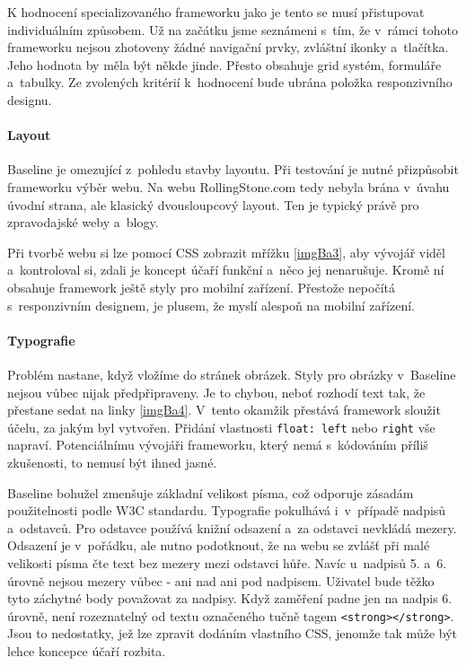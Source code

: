 \documentclass[thesis=B,czech]{FITthesis}[2012/06/26]
\begin{document}
K hodnocení specializovaného frameworku jako je tento se musí přistupovat individuálním způsobem. Už na začátku jsme seznámeni s~tím, že v~rámci tohoto frameworku nejsou zhotoveny žádné navigační prvky, zvláštní ikonky a~tlačítka. Jeho hodnota by měla být někde jinde. Přesto obsahuje grid  systém, formuláře a~tabulky. Ze zvolených kritérií k~hodnocení bude ubrána položka responzivního designu.

\paragraph{Layout}

Baseline je omezující z~pohledu stavby layoutu. Při testování je nutné přizpůsobit frameworku výběr webu. Na webu RollingStone.com tedy nebyla brána v~úvahu úvodní strana, ale klasický dvousloupcový layout. Ten je typický právě pro zpravodajské weby a~blogy.

Při tvorbě webu si lze pomocí \gls{CSS} zobrazit mřížku \ref{imgBa3}, aby vývojář viděl a~kontroloval si, zdali je koncept účaří funkční a~něco jej nenarušuje. Kromě ní obsahuje framework ještě styly pro mobilní zařízení. Přestože nepočítá s~responzivním designem, je plusem, že myslí alespoň na mobilní zařízení. 



\paragraph{Typografie}

Problém nastane, když vložíme do stránek obrázek. Styly pro obrázky v~Baseline nejsou vůbec nijak předpřipraveny. Je to chybou, neboť rozhodí text tak, že přestane sedat na linky \ref{imgBa4}. V~tento okamžik přestává framework sloužit účelu, za jakým byl vytvořen. Přidání vlastnosti \verb#float: left# nebo \verb#right# vše napraví. Potenciálnímu vývojáři frameworku, který nemá s~kódováním příliš zkušenosti, to nemusí být ihned jasné. 

Baseline bohužel zmenšuje základní velikost písma, což odporuje zásadám použitelnosti podle \gls{W3C} standardu\cite{wcag}. Typografie pokulhává i~v~případě nadpisů a~odstavců. Pro odstavce používá knižní odsazení a~za odstavci nevkládá mezery. Odsazení je v~pořádku, ale nutno podotknout, že na webu se zvlášť při malé velikosti písma čte text bez mezery mezi odstavci hůře. Navíc u~nadpisů 5. a~6. úrovně nejsou mezery vůbec - ani nad ani pod nadpisem. Uživatel bude těžko tyto záchytné body považovat za nadpisy. Když zaměření padne jen na nadpis 6. úrovně, není rozeznatelný od textu označeného tučně tagem \verb#<strong></strong>#. Jsou to nedostatky, jež lze zpravit dodáním vlastního \gls{CSS}, jenomže tak může být lehce koncepce účaří rozbita.
\end{document}
